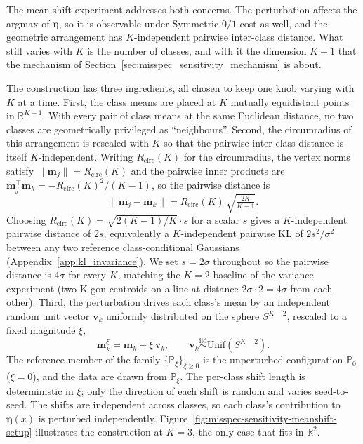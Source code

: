 The mean-shift experiment addresses both concerns. The perturbation affects the argmax of $\boldsymbol{\eta}$, so it is observable under Symmetric $0/1$ cost as well, and the geometric arrangement has $K$-independent pairwise inter-class distance. What still varies with $K$ is the number of classes, and with it the dimension $K-1$ that the mechanism of Section~\ref{sec:misspec_sensitivity_mechanism} is about.

The construction has three ingredients, all chosen to keep one knob varying with $K$ at a time. First, the class means are placed at $K$ mutually equidistant points in $\mathbb{R}^{K-1}$. With every pair of class means at the same Euclidean distance, no two classes are geometrically privileged as ``neighbours''. Second, the circumradius of this arrangement is rescaled with $K$ so that the pairwise inter-class distance is itself $K$-independent. Writing $R_{\mathrm{circ}}(K)$ for the circumradius, the vertex norms satisfy $\|\mathbf{m}_j\| = R_{\mathrm{circ}}(K)$ and the pairwise inner products are $\mathbf{m}_j^\top \mathbf{m}_k = -R_{\mathrm{circ}}(K)^2 / (K-1)$, so the pairwise distance is
\begin{equation}
    \|\mathbf{m}_j - \mathbf{m}_k\| = R_{\mathrm{circ}}(K)\,\sqrt{\tfrac{2K}{K-1}}.
    \label{eq:meanshift_pairwise}
\end{equation}
Choosing $R_{\mathrm{circ}}(K) = \sqrt{2(K-1)/K} \cdot s$ for a scalar $s$ gives a $K$-independent pairwise distance of $2s$, equivalently a $K$-independent pairwise KL of $2s^2/\sigma^2$ between any two reference class-conditional Gaussians (Appendix~\ref{app:kl_invariance}). We set $s = 2\sigma$ throughout so the pairwise distance is $4\sigma$ for every $K$, matching the $K=2$ baseline of the variance experiment (two K-gon centroids on a line at distance $2\sigma \cdot 2 = 4\sigma$ from each other). Third, the perturbation drives each class's mean by an independent random unit vector $\mathbf{v}_k$ uniformly distributed on the sphere $S^{K-2}$, rescaled to a fixed magnitude $\xi$,
\begin{equation}
    \mathbf{m}_k^{\xi} = \mathbf{m}_k + \xi\,\mathbf{v}_k, \qquad \mathbf{v}_k \overset{\mathrm{iid}}{\sim} \mathrm{Unif}(S^{K-2}).
    \label{eq:meanshift}
\end{equation}
The reference member of the family $\{\mathbb{P}_\xi\}_{\xi \geq 0}$ is the unperturbed configuration $\mathbb{P}_0$ ($\xi = 0$), and the data are drawn from $\mathbb{P}_\xi$. The per-class shift length is deterministic in $\xi$; only the direction of each shift is random and varies seed-to-seed. The shifts are independent across classes, so each class's contribution to $\boldsymbol{\eta}(x)$ is perturbed independently. Figure~\ref{fig:misspec-sensitivity-meanshift-setup} illustrates the construction at $K = 3$, the only case that fits in $\mathbb{R}^2$.

